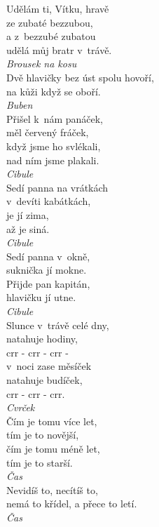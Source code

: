 \begin{multicols}{\value{columnsthindata}}
\noindent
Udělám ti, Vítku, hravě\\
ze zubaté bezzubou,\\
a z~bezzubé zubatou\\
udělá můj bratr v~trávě.\\[1 mm]
{\sl Brousek na kosu}\\

\noindent
Dvě hlavičky bez úst spolu hovoří,\\
na kůži když se oboří.\\[1 mm]
{\sl Buben}\\

\noindent
Přišel k~nám panáček,\\
měl červený fráček,\\
když jsme ho svlékali,\\
nad ním jsme plakali.\\[1 mm]
{\sl Cibule}\\

\noindent
Sedí panna na vrátkách\\
v~devíti kabátkách,\\
je jí zima,\\
až je siná.\\[1 mm]
{\sl Cibule}\\

\noindent
Sedí panna v~okně,\\
suknička jí mokne.\\
Přijde pan kapitán,\\
hlavičku jí utne.\\[1 mm]
{\sl Cibule}\\

\noindent
Slunce v~trávě celé dny,\\
natahuje hodiny,\\
crr - crr - crr -\\
v~noci zase měsíček\\
natahuje budíček,\\
crr - crr - crr.\\[1 mm]
{\sl Cvrček}\\

\noindent
Čím je tomu více let,\\
tím je to novější,\\
čím je tomu méně let,\\
tím je to starší.\\[1 mm]
{\sl Čas}\\

\noindent
Nevidíš to, necítíš to,\\
nemá to křídel, a přece to letí.\\[1 mm]
{\sl Čas}\\


\end{multicols}
